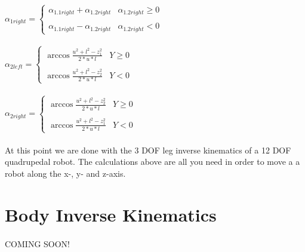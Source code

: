 \documentclass{article}
\begin{document}
\begin{center}
    \paragraph{}
    $\alpha_{1right} = \left\{
    \begin{array}{ll}
    \alpha_{1.1right} + \alpha_{1.2right} & \alpha_{1.2right} \ge 0 \\ \\
    \alpha_{1.1right} - \alpha_{1.2right} & \alpha_{1.2right} < 0
    \end{array}
    \right. $   

    \paragraph{}
    $\alpha_{2left} = \left\{
    \begin{array}{ll}
    \arccos \frac{u^2 + l^2 - z_1^2}{2 * u * l} & Y \ge 0 \\ \\
    \arccos \frac{u^2 + l^2 - z_2^2}{2 * u * l} & Y < 0
    \end{array}
    \right. $   

    \paragraph{}
    $\alpha_{2right} = \left\{
    \begin{array}{ll}
    \arccos \frac{u^2 + l^2 - z_2^2}{2 * u * l} & Y \ge 0 \\ \\
    \arccos \frac{u^2 + l^2 - z_1^2}{2 * u * l} & Y < 0
    \end{array}
    \right. $  
    \end{center}

    \paragraph{}
    At this point we are done with the 3 DOF leg inverse kinematics of a 12 DOF quadrupedal robot. The calculations above are all you need in order to move a a robot along the x-, y- and z-axis. 



    \section{Body Inverse Kinematics}
    \paragraph{}
    COMING SOON!
\end{document}
